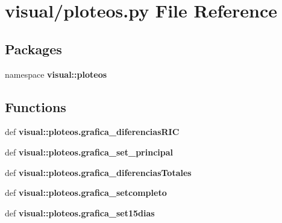 \section{visual/ploteos.py \-File \-Reference}
\label{ploteos_8py}
\subsection*{\-Packages}
\begin{DoxyCompactItemize}
\item 
namespace {\bf visual\-::ploteos}
\end{DoxyCompactItemize}
\subsection*{\-Functions}
\begin{DoxyCompactItemize}
\item 
def {\bf visual\-::ploteos.\-grafica\-\_\-diferencias\-R\-I\-C}
\item 
def {\bf visual\-::ploteos.\-grafica\-\_\-set\-\_\-principal}
\item 
def {\bf visual\-::ploteos.\-grafica\-\_\-diferencias\-Totales}
\item 
def {\bf visual\-::ploteos.\-grafica\-\_\-setcompleto}
\item 
def {\bf visual\-::ploteos.\-grafica\-\_\-set15dias}
\end{DoxyCompactItemize}
